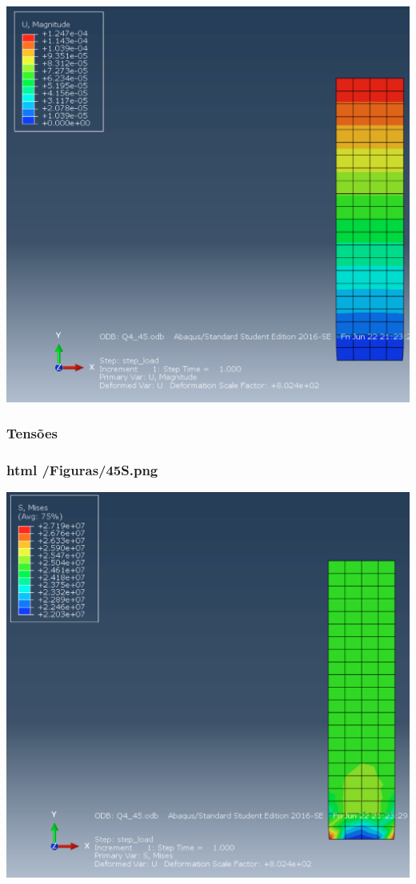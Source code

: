 \begin{DoxyImageNoCaption}
  \mbox{\includegraphics[width=\textwidth,height=\textheight/2,keepaspectratio=true]{45U.png}}
\end{DoxyImageNoCaption}
 

\subsubsection*{Tensões}

\subsubsection*{html /\+Figuras/45S.png}


\begin{DoxyImageNoCaption}
  \mbox{\includegraphics[width=\textwidth,height=\textheight/2,keepaspectratio=true]{45S.png}}
\end{DoxyImageNoCaption}
 

